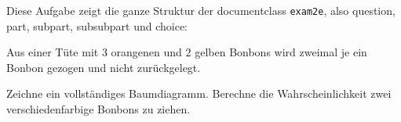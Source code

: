 \documentclass[a4paper,12pt]{article}
\begin{document}
\begin{question}
	Diese Aufgabe zeigt die ganze Struktur der documentclass \texttt{exam2e}, also question, part, subpart, subsubpart und choice:
\end{question}
\omitsolution




\begin{question}[5]
	Aus einer Tüte mit 
	3 orangenen und 2 gelben Bonbons
	wird zweimal je ein Bonbon gezogen und nicht zurückgelegt.
\begin{subparts}
	\subpart Zeichne ein vollständiges Baumdiagramm.
%
	\subpart Berechne die Wahrscheinlichkeit zwei verschiedenfarbige Bonbons zu ziehen.
\end{subparts}
\end{question}
\end{document}
